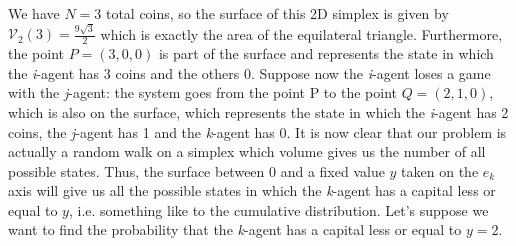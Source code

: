 We have $N=3$ total coins, so the surface of this 2D simplex is given by $\mathcal{V}_{2}\left(3\right) = \frac{9\sqrt{3}}{2}$ which is exactly the area of the equilateral triangle.
Furthermore, the point $P = (3, 0, 0)$ is part of the surface and represents the state in which the \emph{i}-agent has 3 coins and the others 0.
Suppose now the \emph{i}-agent loses a game with the \emph{j}-agent: the system goes from the point P to the point $Q = (2, 1, 0)$, which is also on the surface, which represents the state in which the \emph{i}-agent has 2 coins, the \emph{j}-agent has 1 and the \emph{k}-agent has 0.
It is now clear that our problem is actually a random walk on a simplex which volume gives us the number of all possible states.
Thus, the surface between 0 and a fixed value $y$ taken on the $e_k$ axis will give us all the possible states in which the \emph{k}-agent has a capital less or equal to $y$, i.e. something like to the cumulative distribution.
Let's suppose we want to find the probability that the \emph{k}-agent has a capital less or equal to $y=2$.
